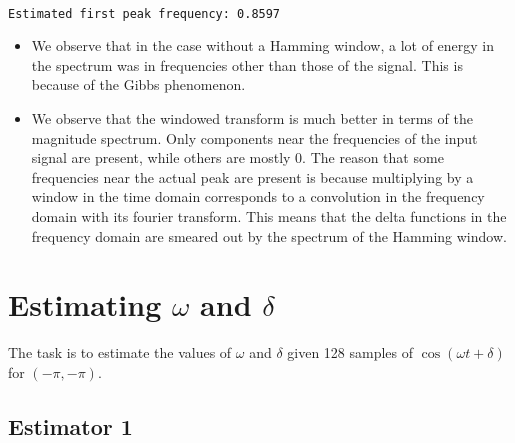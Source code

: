 \documentclass[11pt]{article}
\providecommand{\tightlist}{%
      \setlength{\itemsep}{0pt}\setlength{\parskip}{0pt}}
\begin{document}
    \begin{center}
    \end{center}
    { \hspace*{\fill} \\}
    
	

    \begin{Verbatim}[commandchars=\\\{\}]
Estimated first peak frequency: 0.8597

    \end{Verbatim}

	
		
    \begin{itemize}
\tightlist
\item
  We observe that in the case without a Hamming window, a lot of energy
  in the spectrum was in frequencies other than those of the signal.
  This is because of the Gibbs phenomenon.
\item
  We observe that the windowed transform is much better in terms of the
  magnitude spectrum. Only components near the frequencies of the input
  signal are present, while others are mostly 0. The reason that some
  frequencies near the actual peak are present is because multiplying by
  a window in the time domain corresponds to a convolution in the
  frequency domain with its fourier transform. This means that the delta
  functions in the frequency domain are smeared out by the spectrum of
  the Hamming window.
\end{itemize}

	

	
		
    \section{\texorpdfstring{Estimating \(\omega\) and
\(\delta\)}{Estimating \textbackslash{}omega and \textbackslash{}delta}}\label{estimating-omega-and-delta}

	

	
		
    The task is to estimate the values of \(\omega\) and \(\delta\) given
128 samples of \(\cos (\omega t + \delta)\) for \((-\pi, -\pi)\).

	

	
		
    \subsection{Estimator 1}\label{estimator-1}
\end{document}
